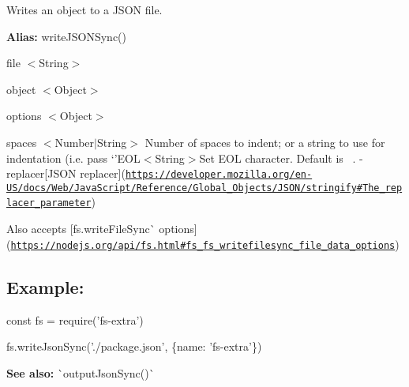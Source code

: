 Writes an object to a J\+S\+ON file.

{\bfseries Alias\+:} {\ttfamily write\+J\+S\+O\+N\+Sync()}


\begin{DoxyItemize}
\item {\ttfamily file} {\ttfamily $<$String$>$}
\item {\ttfamily object} {\ttfamily $<$Object$>$}
\item {\ttfamily options} {\ttfamily $<$Object$>$}
\begin{DoxyItemize}
\item {\ttfamily spaces} {\ttfamily $<$Number$\vert$\+String$>$} Number of spaces to indent; or a string to use for indentation (i.\+e. pass `'E\+O\+L$<$\+String$>${\ttfamily Set E\+OL character. Default is}~\newline
{\ttfamily . -\/}replacer{\ttfamily \mbox{[}J\+S\+ON replacer\mbox{]}(\href{https://developer.mozilla.org/en-US/docs/Web/JavaScript/Reference/Global_Objects/JSON/stringify#The_replacer_parameter}{\tt https\+://developer.\+mozilla.\+org/en-\/\+U\+S/docs/\+Web/\+Java\+Script/\+Reference/\+Global\+\_\+\+Objects/\+J\+S\+O\+N/stringify\#\+The\+\_\+replacer\+\_\+parameter})}
\item {\ttfamily Also accepts \mbox{[}}fs.\+write\+File\+Sync\`{} options\mbox{]}(\href{https://nodejs.org/api/fs.html#fs_fs_writefilesync_file_data_options}{\tt https\+://nodejs.\+org/api/fs.\+html\#fs\+\_\+fs\+\_\+writefilesync\+\_\+file\+\_\+data\+\_\+options})
\end{DoxyItemize}
\end{DoxyItemize}

\subsection*{Example\+:}


\begin{DoxyCode}
const fs = require('fs-extra')

fs.writeJsonSync('./package.json', \{name: 'fs-extra'\})
\end{DoxyCode}




{\bfseries See also\+:} \`{}output\+Json\+Sync()\`{} 